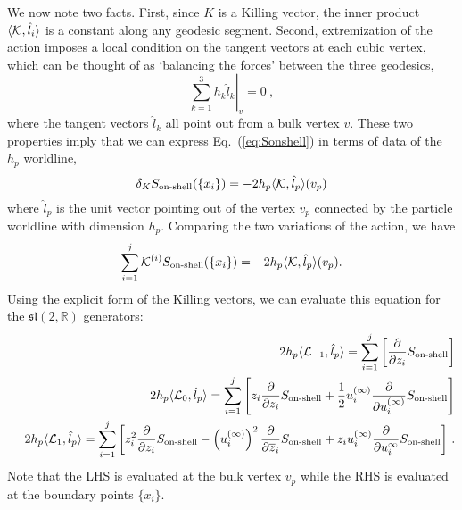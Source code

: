 \documentclass[12pt]{article}
\def\zb{\overline{z}}
\renewcommand{\inf}{{\infty}}
\newcommand{\sltwo}{$\lie{sl}(2,\RR)$ }
\newcommand{\bea}{\begin{eqnarray}}
\newcommand{\eea}{\end{eqnarray}}
\newcommand{\RR}{\mathbb{R}}
\newcommand{\lie}[1]{\mathfrak{#1}}
\begin{document}
We now note two facts.  First,  since $K$ is a Killing vector, the inner product $\langle{\cal{K}},\hat{l}_i\rangle$ is a constant along any geodesic segment.
Second, extremization of the action imposes a local condition on the tangent vectors at each cubic vertex, which can be thought of as `balancing the forces' between the three geodesics,
\begin{equation}
\left. \sum_{k=1}^{3}h_k{\hat{l}}_k \right|_v=0~,
 \end{equation}
where the tangent vectors $\hat{l}_k$ all point out from a bulk vertex $v$.
 These two properties imply that we can express Eq.~(\ref{eq:Sonshell}) in terms of data of the $h_p$ worldline,
 \begin{equation}
 \delta_K S_{\text{on-shell}}(\{x_i\})=-2h_p\langle{{\cal{K}}},\hat{l}_p\rangle(v_p)
 \end{equation}
where $\hat{l}_p$ is the unit vector pointing out of the vertex $v_p$ connected by the particle worldline with dimension $h_p$. Comparing the two variations of the action, we have
\begin{equation}
\sum_{i=1}^{j} {\cal{K}}^{(i)} S_{\text{on-shell}}(\{x_i\})=-2h_p\langle {\cal{K}},\hat{l}_p \rangle(v_p).
\end{equation}
Using the explicit form of the Killing vectors, we can evaluate this equation for the  \sltwo generators:
\bea\label{Killingdiff} &~& 2h_p\langle {\cal{L}}_{-1},\hat{l}_p\rangle=\sum_{i=1}^{j}
\left[\frac{\partial}{\partial z_{i}}S_{\text{on-shell}} \right]\notag \\
&~& 2h_p\langle{\cal{L}}_0,\hat{l}_p\rangle=\sum_{i=1}^{j}
\left[
z_{i}\frac{\partial}{\partial z_{i}}S_{\text{on-shell}}+\frac{1}{2}u_{i}^{(\inf)}
\frac{\partial}{\partial u_{i}^{(\inf)}}S_{\text{on-shell}} \right]\notag \\
&~&2 h_p \langle {\cal{L}}_1,\hat{l}_p\rangle=\sum_{i=1}^{j}\left[
z_{i}^2\frac{\partial}{\partial z_{i}}S_{\text{on-shell}}-\left(u_{i}^{(\inf)}\right)^2
\frac{\partial}{\partial \zb_{i}}S_{\text{on-shell}}+z_{i}u_{i}^{(\inf)}
\frac{\partial}{\partial u_{i}^{\inf}}S_{\text{on-shell}}\right] \,.\notag \\
\eea
Note that the LHS is evaluated at the bulk vertex $v_p$ while the RHS is evaluated at the boundary points $\{x_i\}$.
\end{document}
